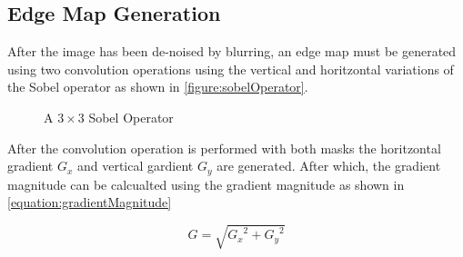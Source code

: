 \documentclass[conference]{IEEEtran}
\begin{document}
\subsection{Edge Map Generation}
After the image has been de-noised by blurring, an edge map must be generated using two convolution operations using the vertical and horitzontal variations of the Sobel operator as shown in \autoref{figure:sobelOperator}.
\begin{figure}[h] %
  \centering
  \hfil
  \caption{A $3 \times 3$ Sobel Operator}\label{figure:sobelOperator}
\end{figure}

After the convolution operation is performed with both masks the horitzontal gradient $G_x$ and vertical gardient $G_y$ are generated. 
After which, the gradient magnitude can be calcualted using the gradient magnitude as shown in \autoref{equation:gradientMagnitude}

\begin{equation}
  G = \sqrt{{G_x}^2 + {G_y}^2}\label{equation:gradientMagnitude}
\end{equation}



\end{document}
